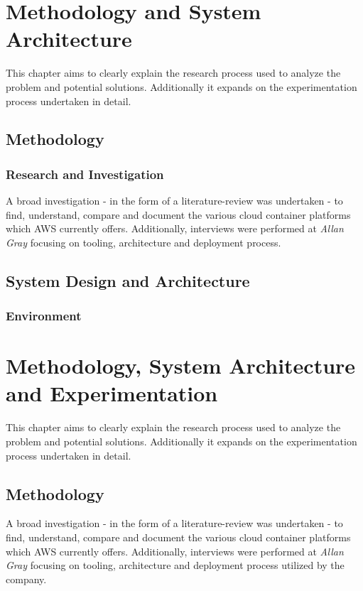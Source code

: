 \part{Methodology and System Architecture}

This chapter aims to clearly explain the research process used to analyze the problem and potential solutions.
Additionally it expands on the experimentation process undertaken in detail.

\chapter{Methodology}

\section{Research and Investigation}

A broad investigation - in the form of a literature-review was undertaken - to find, understand, compare and document the various cloud container platforms which AWS currently offers.
Additionally, interviews were performed at \emph{Allan Gray} focusing on tooling, architecture and deployment process.

\chapter{System Design and Architecture}
\section{Environment}
\part{Methodology, System Architecture and Experimentation}

This chapter aims to clearly explain the research process used to analyze the problem and potential solutions.
Additionally it expands on the experimentation process undertaken in detail.

\chapter{Methodology}

A broad investigation - in the form of a literature-review was undertaken - to find, understand, compare and document the various cloud container platforms which AWS currently offers.
Additionally, interviews were performed at \emph{Allan Gray} focusing on tooling, architecture and deployment process utilized by the company.

